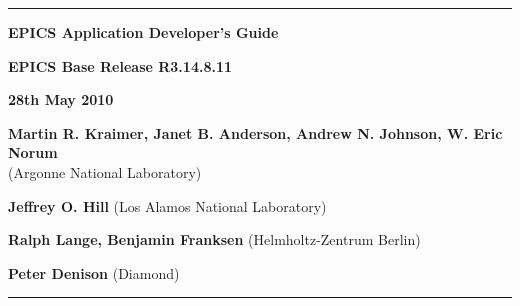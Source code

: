 \hrule

\vspace{1in}

\noindent \Huge \textbf{EPICS Application Developer's Guide}

\vspace{0.5in}

\noindent \Large \textbf{EPICS Base Release R3.14.8.11}

\noindent \textbf{28th May 2010}

\vspace{0.5in}

\noindent \normalsize \textbf{Martin R. Kraimer, Janet B. Anderson, Andrew N. Johnson, W. Eric Norum}\\
(Argonne National Laboratory)

\noindent \textbf{Jeffrey O. Hill} (Los Alamos National Laboratory)

\noindent \textbf{Ralph Lange, Benjamin Franksen} (Helmholtz-Zentrum Berlin)

\noindent \textbf{Peter Denison} (Diamond)

\vspace{1in}
\hrule
